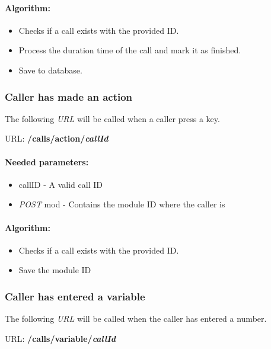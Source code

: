 \paragraph{Algorithm:}
\begin{itemize}
	\item Checks if a call exists with the provided ID.
	\item Process the duration time of the call and mark it as finished.
	\item Save to database.

\end{itemize}


\subsubsection{Caller has made an action}
The following \textit{URL} will be called when a caller press a key.
\newline

URL: \textbf{/calls/action/{\textit{callId}}}

\paragraph{Needed parameters:}
\begin{itemize}
\item {callID} - A valid call ID
\item \textit{POST} {mod} - Contains the module ID where the caller is
\end{itemize}


\paragraph{Algorithm:}
\begin{itemize}
	\item Checks if a call exists with the provided ID.
	\item Save the module ID 

\end{itemize}


\subsubsection{Caller has entered a variable}
The following \textit{URL} will be called when the caller has entered a number.
\newline

URL: \textbf{/calls/variable/{\textit{callId}}}


